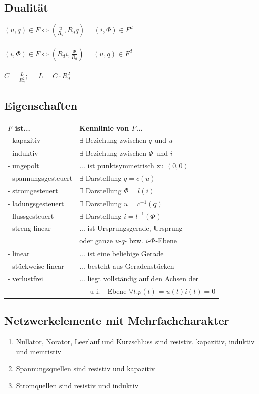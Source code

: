 \documentclass[a4paper,twocolumn,10pt]{article}
\begin{document}
\subsection*{Dualität}
$(u,q)\in F \Leftrightarrow (\frac{u}{R_d},R_dq)=(i,\Phi)\in F^d$\\\\
$(i,\Phi)\in F \Leftrightarrow (R_di,\frac{\Phi}{R_d})=(u,q)\in F^d$\\\\
$C=\frac{L}{R_d^2};\;\;\;\;\;L=C\cdot R_d^2$

\subsection*{Eigenschaften}
\begin{tabular}{ll}
\textbf{$F$ ist...} & \textbf{Kennlinie von $F$...}\\
- kapazitiv & $\exists $ Beziehung zwischen $q$ und $u$\\
- induktiv & $\exists $ Beziehung zwischen $\Phi$ und $i$\\
- ungepolt & ... ist punktsymmetrisch zu $(0,0)$\\
- spannungsgesteuert & $\exists$ Darstellung $q=c(u)$\\
- stromgesteuert & $\exists$ Darstellung $\Phi=l(i)$\\
- ladungsgesteuert & $\exists$ Darstellung $u=c^{-1}(q)$\\
- flussgesteuert & $\exists$ Darstellung $i=l^{-1}(\Phi)$\\
- streng linear & ... ist Ursprungsgerade, Ursprung\\
 & \;\;\;\;oder ganze $u$-$q$- bzw. $i$-$\Phi$-Ebene\\
- linear & ... ist eine beliebige Gerade\\
- stückweise linear & ... besteht aus Geradenstücken\\
- verlustfrei & ... liegt vollständig auf den Achsen der\\
              & ~~~u-i. - Ebene $\forall t. p(t)=u(t)i(t)=0$
\end{tabular}

\subsection*{Netzwerkelemente mit Mehrfachcharakter}
\begin{enumerate}[label=-,leftmargin=3mm]
	\item Nullator, Norator, Leerlauf und Kurzschluss sind resistiv, kapazitiv, induktiv und memristiv
	\item Spannungsquellen sind resistiv und kapazitiv
	\item Stromquellen sind resistiv und induktiv
\end{enumerate}
\end{document}
